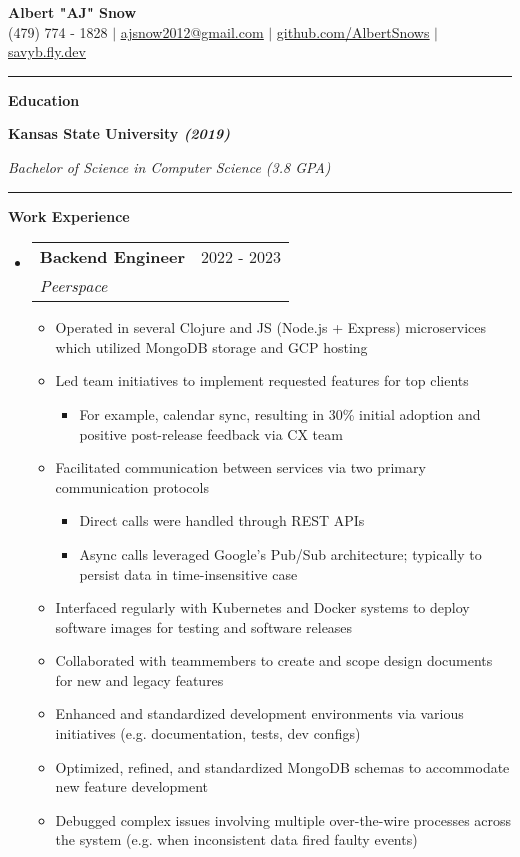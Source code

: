 \documentclass[letterpaper,11pt]{article}
\makeatletter
\newcommand{\resumeItem}[1]{
  \item\small{
    {#1 \vspace{-2pt}}
  }
}
\newcommand{\resumeSubheading}[4]{
  \vspace{-2pt}\item
    \begin{tabular*}{0.97\textwidth}[t]{l@{\extracolsep{\fill}}r}
      \textbf{#1} & #2 \\
      \textit{\small#3} & \textit{\small #4} \\
    \end{tabular*}\vspace{0pt}
}
\newcommand{\resumeSubHeadingListStart}{\begin{itemize}[leftmargin=0.15cm, label={}]}
\newcommand{\resumeSubHeadingListEnd}{\end{itemize}}
\newcommand{\resumeItemListStart}{\begin{itemize}}
\newcommand{\resumeItemListEnd}{\end{itemize}\vspace{-5pt}}
\makeatother
\begin{document}
\textbf{\normalshape \Large \textcolor{magic_blue}{Albert "AJ" Snow}} \\ \vspace{3pt}
\small (479) 774 - 1828 $|$ \href{mailto:ajsnow2012@gmail.com}
{\underline{ajsnow2012@gmail.com}} $|$
\href{https://github.com/AlbertSnows}{\underline{github.com/AlbertSnows}}
$|$ \href{https://savyb.fly.dev/}{\underline{savyb.fly.dev}}
\noindent\rule{19.5cm}{0.4pt}

\textbf{\large \textcolor{magic_blue}{Education}}

\begin{minipage}[t]{0.45\textwidth}
	\raggedright
	\textbf{ Kansas State University \textit{(2019)}} \\
\end{minipage}
\hfill
\begin{minipage}[t]{0.45\textwidth}
	\raggedleft
	\textit{Bachelor of Science in Computer Science (3.8 GPA)} \\
\end{minipage}
\noindent\rule{19.5cm}{0.4pt}

\textbf{\large \textcolor{magic_blue}{Work Experience}}
\resumeSubHeadingListStart
\resumeSubheading
{Backend Engineer}{2022 - 2023}
{Peerspace}{}
\resumeItemListStart
\resumeItem{Operated in several Clojure and JS (Node.js + Express) microservices which utilized MongoDB storage and GCP hosting}
\resumeItem{ Led team initiatives to implement requested features for top clients }
\begin{itemize}
	\item For example, calendar sync, resulting in 30\% initial adoption and positive post-release feedback via CX team
\end{itemize}
\resumeItem{Facilitated communication between services via two primary communication protocols}
\begin{itemize}
	\item Direct calls were handled through REST APIs
	\item Async calls leveraged Google's Pub/Sub architecture; typically to persist data in time-insensitive case
\end{itemize}
\resumeItem{Interfaced regularly with Kubernetes and Docker systems to deploy software images for testing and software releases}
\resumeItem{Collaborated with teammembers to create and scope design documents for new and legacy features}
\resumeItem{Enhanced and standardized development environments via various initiatives (e.g. documentation, tests, dev configs)}
\resumeItem{Optimized, refined, and standardized MongoDB schemas to accommodate new feature development}
\resumeItem{Debugged complex issues involving multiple over-the-wire processes across the system (e.g. when inconsistent data fired faulty events) }
\resumeItemListEnd
\resumeSubHeadingListEnd
\end{document}
